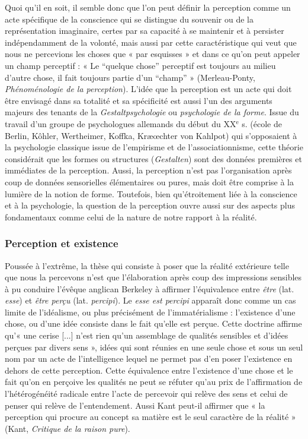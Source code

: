 Quoi qu’il en soit, il semble donc que
l’on peut définir la perception comme un
acte spécifique de la conscience qui se distingue
du souvenir ou de la représentation
imaginaire, certes par sa capacité à se
maintenir et à persister indépendamment
de la volonté, mais aussi par cette caractéristique
qui veut que nous ne percevions
les choses que « par esquisses » et dans ce
qu'on peut appeler un champ perceptif :
« Le “quelque chose” perceptif est toujours
au milieu d’autre chose, il fait toujours
partie d’un “champ” » (Merleau-Ponty,
{\it Phénoménologie de la perception}).
L'idée que la perception est un acte qui
doit être envisagé dans sa totalité et sa
spécificité est aussi l’un des arguments
majeurs des tenants de la {\it Gestaltpsychologie}
ou {\it psychologie de la forme}. Issue du
travail d’un groupe de psychologues allemands
du début du {\footnotesize XX}$^\text{e}$ s. (école de Berlin,
Kôhler, Wertheimer, Koffka, Kræœchter
von Kahlpot) qui s’opposaient à la psychologie
classique issue de l’empirisme et
de l’associationnisme, cette théorie considérait
que les formes ou structures ({\it Gestalten})
sont des données premières et
immédiates de la perception. Aussi, la
perception n’est pas l’organisation après
coup de données sensorielles élémentaires
ou pures, mais doit être comprise à
la lumière de la notion de forme. Toutefois,
bien  qu’étroitement liée à la
conscience et à la psychologie, la question
de la perception ouvre aussi sur des
aspects plus fondamentaux comme celui
de la nature de notre rapport à la réalité.

\subsubsection{Perception et existence}

Poussée à l'extrême, la thèse qui
consiste à poser que la réalité extérieure
telle que nous la percevons n’est que l’élaboration
après coup des impressions sensibles
à pu conduire l’évêque anglican
Berkeley à affirmer l’équivalence entre
{\it être} (lat. {\it esse}) et {\it être perçu} (lat. {\it percipi}).
Le {\it esse est percipi} apparaît donc comme
un cas limite de l’idéalisme, ou plus précisément
de l’immatérialisme : l'existence
d’une chose, ou d’une idée consiste dans
le fait qu’elle est perçue. Cette doctrine
affirme qu’« une cerise [...] n’est rien
qu'un assemblage de qualités sensibles et
d'idées perçues par divers sens », idées
qui sont réunies en une seule chose et
sous un seul nom par un acte de l’intelligence
lequel ne permet pas d’en poser
l'existence en dehors de cette perception.
Cette équivalence entre l’existence d’une
chose et le fait qu’on en perçoive les qualités
ne peut se réfuter qu’au prix de l’affirmation
de l’hétérogénéité radicale
entre l’acte de percevoir qui relève des
sens et celui de penser qui relève de l’entendement.
Aussi Kant peut-il affirmer
que « la perception qui procure au
concept sa matière est le seul caractère de
la réalité » (Kant, {\it Critique de la raison
pure}).

